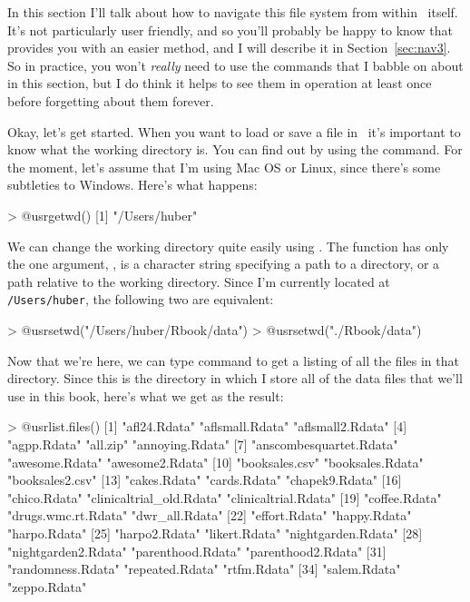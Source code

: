 In this section I'll talk about how to navigate this file system from within \R\ itself. It's not particularly user friendly, and so you'll probably be happy to know that \Rstudio provides you with an easier method, and I will describe it in Section~\ref{sec:nav3}. So in practice, you won't {\it really} need to use the commands that I babble on about in this section, but I do think it helps to see them in operation at least once before forgetting about them forever.

Okay, let's get started. When you want to load or save a file in \R\ it's important to know what the working directory is. You can find out by using the  command. For the moment, let's assume that I'm using Mac OS or Linux, since there's some subtleties to Windows. Here's what happens:
\begin{rblock1}
> @usr{getwd()}
[1] "/Users/huber"
\end{rblock1}
We can change the working directory quite easily using . The  function has only the one argument, ,  is a character string specifying a path to a directory, or a path relative to the working directory. Since I'm currently located at \verb#/Users/huber#, the following two are equivalent: 
\begin{rblock1}
> @usr{setwd("/Users/huber/Rbook/data")}
> @usr{setwd("./Rbook/data")}
\end{rblock1}
Now that we're here, we can type  command to get a listing of all the files in that directory. Since this is the directory in which I store all of the data files that we'll use in this book, here's what we get as the result:
\begin{rblock1}
> @usr{list.files()}
 [1] "afl24.Rdata"             "aflsmall.Rdata"          "aflsmall2.Rdata"        
 [4] "agpp.Rdata"              "all.zip"                 "annoying.Rdata"         
 [7] "anscombesquartet.Rdata"  "awesome.Rdata"           "awesome2.Rdata"         
[10] "booksales.csv"           "booksales.Rdata"         "booksales2.csv"         
[13] "cakes.Rdata"             "cards.Rdata"             "chapek9.Rdata"          
[16] "chico.Rdata"             "clinicaltrial_old.Rdata" "clinicaltrial.Rdata"    
[19] "coffee.Rdata"            "drugs.wmc.rt.Rdata"      "dwr_all.Rdata"          
[22] "effort.Rdata"            "happy.Rdata"             "harpo.Rdata"            
[25] "harpo2.Rdata"            "likert.Rdata"            "nightgarden.Rdata"      
[28] "nightgarden2.Rdata"      "parenthood.Rdata"        "parenthood2.Rdata"      
[31] "randomness.Rdata"        "repeated.Rdata"          "rtfm.Rdata"             
[34] "salem.Rdata"             "zeppo.Rdata"
\end{rblock1}
